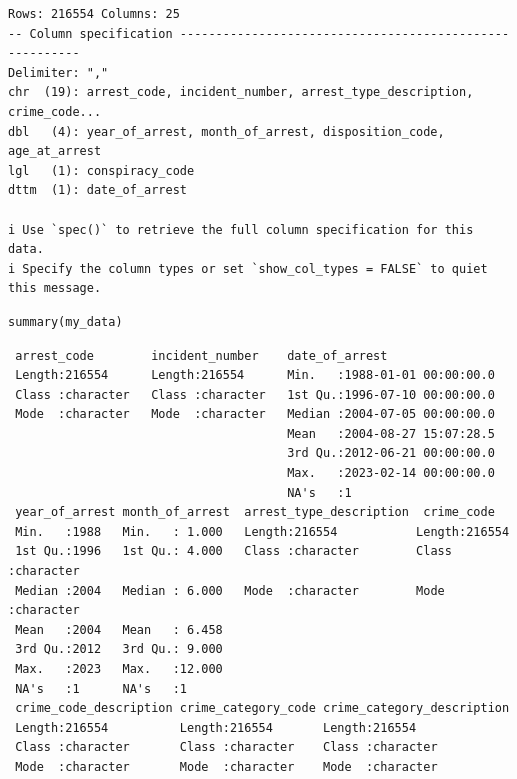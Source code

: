 \documentclass[
  article]{jss}
\begin{document}
\begin{verbatim}
Rows: 216554 Columns: 25
-- Column specification --------------------------------------------------------
Delimiter: ","
chr  (19): arrest_code, incident_number, arrest_type_description, crime_code...
dbl   (4): year_of_arrest, month_of_arrest, disposition_code, age_at_arrest
lgl   (1): conspiracy_code
dttm  (1): date_of_arrest

i Use `spec()` to retrieve the full column specification for this data.
i Specify the column types or set `show_col_types = FALSE` to quiet this message.
\end{verbatim}

\begin{verbatim}
summary(my_data)
\end{verbatim}

\begin{verbatim}
 arrest_code        incident_number    date_of_arrest                 
 Length:216554      Length:216554      Min.   :1988-01-01 00:00:00.0  
 Class :character   Class :character   1st Qu.:1996-07-10 00:00:00.0  
 Mode  :character   Mode  :character   Median :2004-07-05 00:00:00.0  
                                       Mean   :2004-08-27 15:07:28.5  
                                       3rd Qu.:2012-06-21 00:00:00.0  
                                       Max.   :2023-02-14 00:00:00.0  
                                       NA's   :1                      
 year_of_arrest month_of_arrest  arrest_type_description  crime_code       
 Min.   :1988   Min.   : 1.000   Length:216554           Length:216554     
 1st Qu.:1996   1st Qu.: 4.000   Class :character        Class :character  
 Median :2004   Median : 6.000   Mode  :character        Mode  :character  
 Mean   :2004   Mean   : 6.458                                             
 3rd Qu.:2012   3rd Qu.: 9.000                                             
 Max.   :2023   Max.   :12.000                                             
 NA's   :1      NA's   :1                                                  
 crime_code_description crime_category_code crime_category_description
 Length:216554          Length:216554       Length:216554             
 Class :character       Class :character    Class :character          
 Mode  :character       Mode  :character    Mode  :character          
                                                                      
                                                                      
                                                                      

\end{verbatim}
\end{document}
